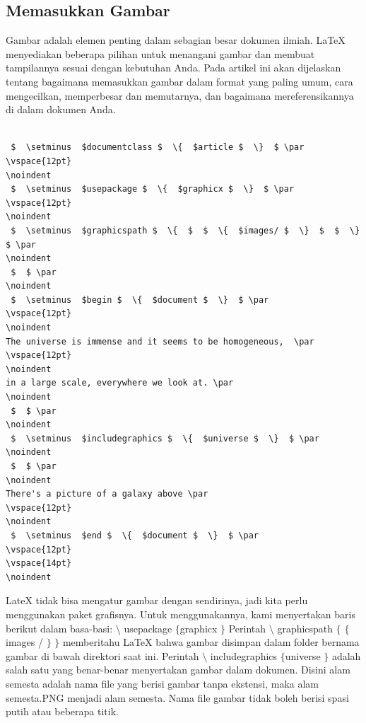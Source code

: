 \subsection {Memasukkan Gambar}
{\fontsize{10pt}{10pt}\selectfont  \hspace*{0.64in} Gambar adalah elemen penting dalam sebagian besar dokumen ilmiah. LaTeX menyediakan beberapa pilihan untuk menangani gambar dan membuat tampilannya sesuai dengan kebutuhan Anda. Pada artikel ini akan dijelaskan tentang  bagaimana memasukkan gambar dalam format yang paling umum, cara mengecilkan, memperbesar dan memutarnya, dan bagaimana mereferensikannya di dalam dokumen Anda.} \par
\vspace{12pt}
\noindent 
\begin{verbatim}

 $  \setminus  $documentclass $  \{  $article $  \}  $ \par
\vspace{12pt}
\noindent 
 $  \setminus  $usepackage $  \{  $graphicx $  \}  $ \par
\vspace{12pt}
\noindent 
 $  \setminus  $graphicspath $  \{  $  $  \{  $images/ $  \}  $  $  \}  $ \par
\noindent 
 $  $ \par
\noindent 
 $  \setminus  $begin $  \{  $document $  \}  $ \par
\vspace{12pt}
\noindent 
The universe is immense and it seems to be homogeneous,  \par
\vspace{12pt}
\noindent 
in a large scale, everywhere we look at. \par
\noindent 
 $  $ \par
\noindent 
 $  \setminus  $includegraphics $  \{  $universe $  \}  $ \par
\noindent 
 $  $ \par
\noindent 
There's a picture of a galaxy above \par
\vspace{12pt}
\noindent 
 $  \setminus  $end $  \{  $document $  \}  $ \par
\vspace{12pt}
\vspace{14pt}
\noindent 
\end{verbatim}
 \hspace*{0.5in} LateX tidak bisa mengatur gambar dengan sendirinya, jadi kita perlu menggunakan paket grafisnya. Untuk menggunakannya, kami menyertakan baris berikut dalam basa-basi:  $  \setminus  $ usepackage  $  \{  $graphicx $  \}  $ Perintah  $  \setminus  $ graphicspath  $  \{  $ $  \{  $images / $  \}  $ $  \}  $ memberitahu LaTeX bahwa gambar disimpan dalam folder bernama gambar di bawah direktori saat ini. Perintah  $  \setminus  $ includegraphics  $  \{  $universe $  \}  $ adalah salah satu yang benar-benar menyertakan gambar dalam dokumen. Disini alam semesta adalah nama file yang berisi gambar tanpa ekstensi, maka alam semesta.PNG menjadi alam semesta. Nama file gambar tidak boleh berisi spasi putih atau beberapa titik. \par
